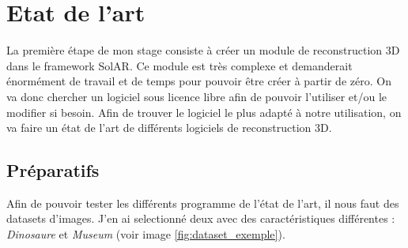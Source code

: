 \chapter{Etat de l'art}
\par
La première étape de mon stage consiste à créer un module de reconstruction 3D dans le framework SolAR. Ce module est très complexe et demanderait énormément de travail et de temps pour pouvoir être créer à partir de zéro. On va donc chercher un logiciel sous licence libre afin de pouvoir l'utiliser et/ou le modifier si besoin. Afin de trouver le logiciel le plus adapté à notre utilisation, on va faire un état de l'art de différents logiciels de reconstruction 3D. 

\section{Préparatifs}

Afin de pouvoir tester les différents programme de l'état de l'art, il nous faut des datasets d'images. J'en ai selectionné deux avec des caractéristiques différentes : \emph{Dinosaure} et \emph{Museum} (voir image \ref{fig:dataset_exemple}). 

